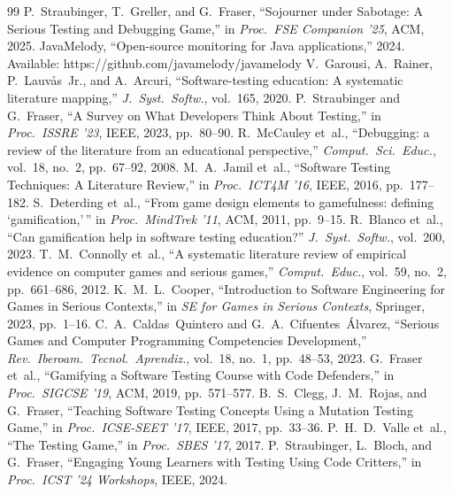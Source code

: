 \documentclass[conference]{IEEEtran}
\begin{document}
\balance

\begin{thebibliography}{99}
 P.~Straubinger, T.~Greller, and G.~Fraser, ``Sojourner under Sabotage: A Serious Testing and Debugging Game,'' in \emph{Proc.\ FSE Companion '25}, ACM, 2025.
 JavaMelody, ``Open-source monitoring for Java applications,'' 2024. Available: https://github.com/javamelody/javamelody
 V.~Garousi, A.~Rainer, P.~Lauv\aa{}s~Jr., and A.~Arcuri, ``Software-testing education: A systematic literature mapping,'' \emph{J.\ Syst.\ Softw.}, vol.~165, 2020.
 P.~Straubinger and G.~Fraser, ``A Survey on What Developers Think About Testing,'' in \emph{Proc.\ ISSRE '23}, IEEE, 2023, pp.~80--90.
 R.~McCauley et~al., ``Debugging: a review of the literature from an educational perspective,'' \emph{Comput.\ Sci.\ Educ.}, vol.~18, no.~2, pp.~67--92, 2008.
 M.~A.~Jamil et~al., ``Software Testing Techniques: A Literature Review,'' in \emph{Proc.\ ICT4M '16}, IEEE, 2016, pp.~177--182.
 S.~Deterding et~al., ``From game design elements to gamefulness: defining `gamification,'\,'' in \emph{Proc.\ MindTrek '11}, ACM, 2011, pp.~9--15.
 R.~Blanco et~al., ``Can gamification help in software testing education?'' \emph{J.\ Syst.\ Softw.}, vol.~200, 2023.
 T.~M.~Connolly et~al., ``A systematic literature review of empirical evidence on computer games and serious games,'' \emph{Comput.\ Educ.}, vol.~59, no.~2, pp.~661--686, 2012.
 K.~M.~L.~Cooper, ``Introduction to Software Engineering for Games in Serious Contexts,'' in \emph{SE for Games in Serious Contexts}, Springer, 2023, pp.~1--16.
 C.~A.~Caldas~Quintero and G.~A.~Cifuentes~\'{A}lvarez, ``Serious Games and Computer Programming Competencies Development,'' \emph{Rev.\ Iberoam.\ Tecnol.\ Aprendiz.}, vol.~18, no.~1, pp.~48--53, 2023.
 G.~Fraser et~al., ``Gamifying a Software Testing Course with Code Defenders,'' in \emph{Proc.\ SIGCSE '19}, ACM, 2019, pp.~571--577.
 B.~S.~Clegg, J.~M.~Rojas, and G.~Fraser, ``Teaching Software Testing Concepts Using a Mutation Testing Game,'' in \emph{Proc.\ ICSE-SEET '17}, IEEE, 2017, pp.~33--36.
 P.~H.~D.~Valle et~al., ``The Testing Game,'' in \emph{Proc.\ SBES '17}, 2017.
 P.~Straubinger, L.~Bloch, and G.~Fraser, ``Engaging Young Learners with Testing Using Code Critters,'' in \emph{Proc.\ ICST '24 Workshops}, IEEE, 2024.

\end{thebibliography}
\end{document}
